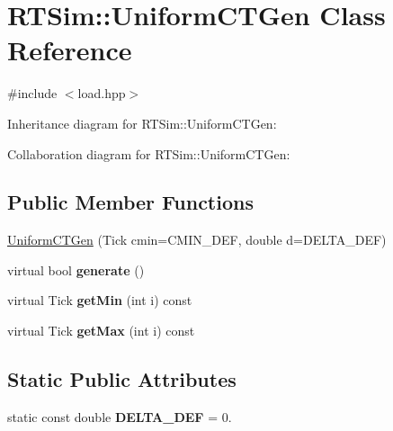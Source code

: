 \hypertarget{classRTSim_1_1UniformCTGen}{}\section{R\+T\+Sim\+:\+:Uniform\+C\+T\+Gen Class Reference}
\label{classRTSim_1_1UniformCTGen}


{\ttfamily \#include $<$load.\+hpp$>$}



Inheritance diagram for R\+T\+Sim\+:\+:Uniform\+C\+T\+Gen\+:


Collaboration diagram for R\+T\+Sim\+:\+:Uniform\+C\+T\+Gen\+:
\subsection*{Public Member Functions}
\begin{DoxyCompactItemize}
\item 
\hyperlink{classRTSim_1_1UniformCTGen_a2ee90b134e046e6e114fc7054687fbe4}{Uniform\+C\+T\+Gen} (Tick cmin=C\+M\+I\+N\+\_\+\+D\+EF, double d=D\+E\+L\+T\+A\+\_\+\+D\+EF)
\item 
virtual bool {\bfseries generate} ()\hypertarget{classRTSim_1_1UniformCTGen_a514cde20bd9bb24ca2ffaab3d729bbde}{}\label{classRTSim_1_1UniformCTGen_a514cde20bd9bb24ca2ffaab3d729bbde}

\item 
virtual Tick {\bfseries get\+Min} (int i) const \hypertarget{classRTSim_1_1UniformCTGen_a8478d27066256fce18e2eec0a21f6a26}{}\label{classRTSim_1_1UniformCTGen_a8478d27066256fce18e2eec0a21f6a26}

\item 
virtual Tick {\bfseries get\+Max} (int i) const \hypertarget{classRTSim_1_1UniformCTGen_aeb3399f238adb3def507cd8c1074203b}{}\label{classRTSim_1_1UniformCTGen_aeb3399f238adb3def507cd8c1074203b}

\end{DoxyCompactItemize}
\subsection*{Static Public Attributes}
\begin{DoxyCompactItemize}
\item 
static const double {\bfseries D\+E\+L\+T\+A\+\_\+\+D\+EF} = 0.\hypertarget{classRTSim_1_1UniformCTGen_a9e979a81fd766e79ea08ea407cb9ba1a}{}\label{classRTSim_1_1UniformCTGen_a9e979a81fd766e79ea08ea407cb9ba1a}

\end{DoxyCompactItemize}

